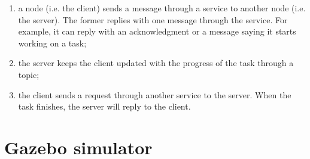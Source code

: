 \documentclass[../thesis.tex]{subfiles}
\begin{document}
\begin{itemize}
\begin{itemize}
\begin{enumerate}
                    \item a node (i.e. the client) sends a message through a service to another node (i.e. the server). The former replies with one message through the service. For example, it can reply with an acknowledgment or a message saying it starts working on a task;
                    \item the server keeps the client updated with the progress of the task through a topic;
                    \item the client sends a request through another service to the server. When the task finishes, the server will reply to the client.
                \end{enumerate}
        \end{itemize}
\end{itemize}

\section{Gazebo simulator}
 
\end{document}
